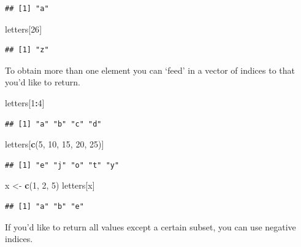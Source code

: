 \documentclass[
]{book}
\newenvironment{Shaded}{\begin{snugshade}}{\end{snugshade}}
\newcommand{\DecValTok}[1]{\textcolor[rgb]{0.00,0.00,0.81}{#1}}
\newcommand{\KeywordTok}[1]{\textcolor[rgb]{0.13,0.29,0.53}{\textbf{#1}}}
\newcommand{\NormalTok}[1]{#1}
\newcommand{\OperatorTok}[1]{\textcolor[rgb]{0.81,0.36,0.00}{\textbf{#1}}}
\newcommand{\StringTok}[1]{\textcolor[rgb]{0.31,0.60,0.02}{#1}}
\theoremstyle{definition}
\theoremstyle{definition}
\theoremstyle{definition}
\theoremstyle{remark}
\begin{document}
\begin{verbatim}
## [1] "a"
\end{verbatim}

\begin{Shaded}
\begin{Highlighting}[]
\NormalTok{letters[}\DecValTok{26}\NormalTok{]}
\end{Highlighting}
\end{Shaded}

\begin{verbatim}
## [1] "z"
\end{verbatim}

To obtain more than one element you can `feed' in a vector of indices to that you'd like to return.

\begin{Shaded}
\begin{Highlighting}[]
\NormalTok{letters[}\DecValTok{1}\OperatorTok{:}\DecValTok{4}\NormalTok{]}
\end{Highlighting}
\end{Shaded}

\begin{verbatim}
## [1] "a" "b" "c" "d"
\end{verbatim}

\begin{Shaded}
\begin{Highlighting}[]
\NormalTok{letters[}\KeywordTok{c}\NormalTok{(}\DecValTok{5}\NormalTok{, }\DecValTok{10}\NormalTok{, }\DecValTok{15}\NormalTok{, }\DecValTok{20}\NormalTok{, }\DecValTok{25}\NormalTok{)]}
\end{Highlighting}
\end{Shaded}

\begin{verbatim}
## [1] "e" "j" "o" "t" "y"
\end{verbatim}

\begin{Shaded}
\begin{Highlighting}[]
\NormalTok{x <-}\StringTok{ }\KeywordTok{c}\NormalTok{(}\DecValTok{1}\NormalTok{, }\DecValTok{2}\NormalTok{, }\DecValTok{5}\NormalTok{)}
\NormalTok{letters[x]}
\end{Highlighting}
\end{Shaded}

\begin{verbatim}
## [1] "a" "b" "e"
\end{verbatim}

If you'd like to return all values except a certain subset, you can use negative indices.
\end{document}
